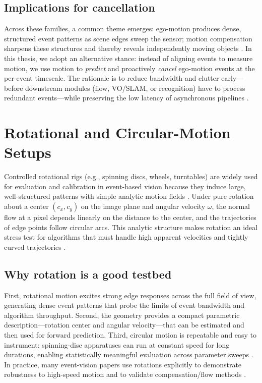 \subsection{Implications for cancellation}
Across these families, a common theme emerges: ego-motion produces dense, structured event patterns as scene edges sweep the sensor; motion compensation sharpens these structures and thereby reveals independently moving objects \cite{Stoffregen2019Segmentation}. In this thesis, we adopt an alternative stance: instead of aligning events to measure motion, we use motion to \emph{predict} and proactively \emph{cancel} ego-motion events at the per-event timescale. The rationale is to reduce bandwidth and clutter early—before downstream modules (flow, VO/SLAM, or recognition) have to process redundant events—while preserving the low latency of asynchronous pipelines \cite{Gallego2018CMax,Bardow2016SOFIE}.

\section{Rotational and Circular-Motion Setups}
\label{sec:rotational-setups}

Controlled rotational rigs (e.g., spinning discs, wheels, turntables) are widely used for evaluation and calibration in event-based vision because they induce large, well-structured patterns with simple analytic motion fields \cite{Gallego2017Angular,Stoffregen2019Segmentation}. Under pure rotation about a center $(c_x,c_y)$ on the image plane and angular velocity $\omega$, the normal flow at a pixel depends linearly on the distance to the center, and the trajectories of edge points follow circular arcs. This analytic structure makes rotation an ideal stress test for algorithms that must handle high apparent velocities and tightly curved trajectories \cite{Gallego2017Angular}.

\subsection{Why rotation is a good testbed}
First, rotational motion excites strong edge responses across the full field of view, generating dense event patterns that probe the limits of event bandwidth and algorithm throughput. Second, the geometry provides a compact parametric description—rotation center and angular velocity—that can be estimated and then used for forward prediction. Third, circular motion is repeatable and easy to instrument: spinning-disc apparatuses can run at constant speed for long durations, enabling statistically meaningful evaluation across parameter sweeps \cite{Stoffregen2019Segmentation}. In practice, many event-vision papers use rotations explicitly to demonstrate robustness to high-speed motion and to validate compensation/flow methods \cite{Gallego2018CMax}.


